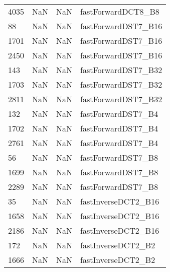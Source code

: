 \begin{tabular}{llll}
4035 &                   NaN &                        NaN &                        fastForwardDCT8\_B8 \\
88   &                   NaN &                        NaN &                       fastForwardDST7\_B16 \\
1701 &                   NaN &                        NaN &                       fastForwardDST7\_B16 \\
2450 &                   NaN &                        NaN &                       fastForwardDST7\_B16 \\
143  &                   NaN &                        NaN &                       fastForwardDST7\_B32 \\
1703 &                   NaN &                        NaN &                       fastForwardDST7\_B32 \\
2811 &                   NaN &                        NaN &                       fastForwardDST7\_B32 \\
132  &                   NaN &                        NaN &                        fastForwardDST7\_B4 \\
1702 &                   NaN &                        NaN &                        fastForwardDST7\_B4 \\
2761 &                   NaN &                        NaN &                        fastForwardDST7\_B4 \\
56   &                   NaN &                        NaN &                        fastForwardDST7\_B8 \\
1699 &                   NaN &                        NaN &                        fastForwardDST7\_B8 \\
2289 &                   NaN &                        NaN &                        fastForwardDST7\_B8 \\
35   &                   NaN &                        NaN &                       fastInverseDCT2\_B16 \\
1658 &                   NaN &                        NaN &                       fastInverseDCT2\_B16 \\
2186 &                   NaN &                        NaN &                       fastInverseDCT2\_B16 \\
172  &                   NaN &                        NaN &                        fastInverseDCT2\_B2 \\
1666 &                   NaN &                        NaN &                        fastInverseDCT2\_B2 \\

\end{tabular}
